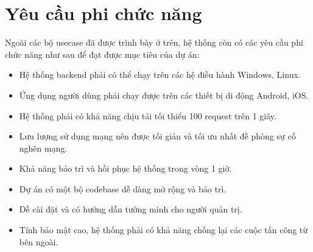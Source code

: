 \documentclass[../DoAn.tex]{subfiles}
\begin{document}
\section{Yêu cầu phi chức năng}
\label{section:ycpcn}
Ngoài các bộ usecase đã được trình bày ở trên, hệ thống còn có các yêu cầu phi chức năng như sau để đạt được mục tiêu của dự án:
\begin{itemize}
    \item Hệ thống backend phải có thể chạy trên các hệ điều hành Windows, Linux.
    \item Ứng dụng người dùng phải chạy được trên các thiết bị di động Android, iOS.
    \item Hệ thống phải có khả năng chịu tải tối thiểu 100 request trên 1 giây.
    \item Lưu lượng sử dụng mạng nên được tối giản và tối ưu nhất đề phòng sự cố nghẽn mạng.
    \item Khả năng bảo trì và hồi phục hệ thống trong vòng 1 giờ.
    \item Dự án có một bộ codebase dễ dàng mở rộng và bảo trì.
    \item Dễ cài đặt và có hướng dẫn tường minh cho người quản trị.
    \item Tính bảo mật cao, hệ thống phải có khả năng chống lại các cuộc tấn công từ bên ngoài.
\end{itemize}


\end{document}
